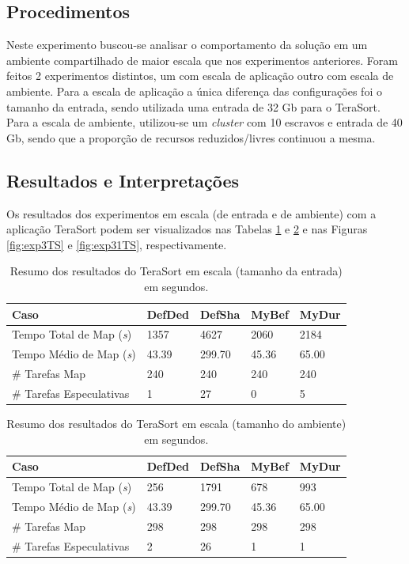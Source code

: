 \subsection{Procedimentos}
Neste experimento buscou-se analisar o comportamento da solução em um ambiente compartilhado de maior escala que nos experimentos anteriores. Foram feitos 2 experimentos distintos, um com escala de aplicação outro com escala de ambiente. Para a escala de aplicação a única diferença das configurações foi o tamanho da entrada, sendo utilizada uma entrada de 32 Gb para o TeraSort. Para a escala de ambiente, utilizou-se um \textit{cluster} com 10 escravos e entrada de 40 Gb, sendo que a proporção de recursos reduzidos/livres continuou a mesma. 

\subsection{Resultados e Interpretações}
Os resultados dos experimentos em escala (de entrada e de ambiente) com a aplicação TeraSort podem ser visualizados nas Tabelas \ref{tab:exp3TS} e \ref{tab:exp31TS} e nas Figuras \ref{fig:exp3TS} e \ref{fig:exp31TS}, respectivamente.

\begin{table}[h!]
	\caption{Resumo dos resultados do TeraSort em escala (tamanho da entrada) em segundos.} \label{tab:exp3TS}
	\begin{tabular*}{\hsize}{l|llll} %
		\textbf{Caso} & \textbf{DefDed} & \textbf{DefSha} & \textbf{MyBef} & \textbf{MyDur}\\
		\hline
		Tempo Total de Map ({\it{s}}) & 1357 & 4627 & 2060 & 2184 \\
		Tempo Médio de Map ({\it{s}}) & 43.39 & 299.70 & 45.36 & 65.00 \\
		\# Tarefas Map & 240 & 240 & 240 & 240 \\
		\# Tarefas Especulativas & 1 & 27 & 0 & 5 \\
	\end{tabular*}
\end{table}
%
%


\begin{table}[h!]
	\caption{Resumo dos resultados do TeraSort em escala (tamanho do ambiente) em segundos.} \label{tab:exp31TS}
	\begin{tabular*}{\hsize}{l|llll} %
		\textbf{Caso} & \textbf{DefDed} & \textbf{DefSha} & \textbf{MyBef} & \textbf{MyDur}\\
		\hline
		Tempo Total de Map ({\it{s}}) & 256 & 1791 & 678 & 993 \\
		Tempo Médio de Map ({\it{s}}) & 43.39 & 299.70 & 45.36 & 65.00 \\
		\# Tarefas Map & 298 & 298 & 298 & 298 \\
		\# Tarefas Especulativas & 2 & 26 & 1 & 1 \\
	\end{tabular*}
\end{table}
%
%

